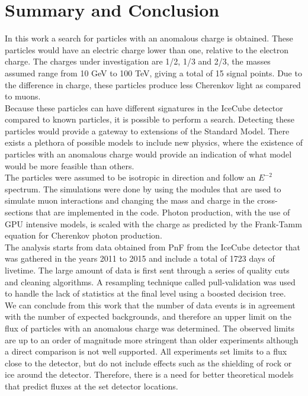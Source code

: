 \chapter{Summary and Conclusion}
\label{ch:summary}
In this work a search for particles with an anomalous charge is obtained. These particles would have an electric charge lower than one, relative to the electron charge. The charges under investigation are 1/2, 1/3 and 2/3, the masses assumed range from 10 GeV to 100 TeV, giving a total of 15 signal points. Due to the difference in charge, these particles produce less Cherenkov light as compared to muons.\\

\noindent Because these particles can have different signatures in the IceCube detector compared to known particles, it is possible to perform a search. Detecting these particles would provide a gateway to extensions of the Standard Model. There exists a plethora of possible models to include new physics, where the existence of particles with an anomalous charge would provide an indication of what model would be more feasible than others.\\

\noindent The particles were assumed to be isotropic in direction and follow an $E^{-2}$ spectrum. The simulations were done by using the modules that are used to simulate muon interactions and changing the mass and charge in the cross-sections that are implemented in the code. Photon production, with the use of GPU intensive models, is scaled with the charge as predicted by the Frank-Tamm equation for Cherenkov photon production.\\

\noindent The analysis starts from data obtained from PnF from the IceCube detector that was gathered in the years 2011 to 2015 and include a total of 1723 days of livetime. The large amount of data is first sent through a series of quality cuts and cleaning algorithms. A resampling technique called pull-validation was used to handle the lack of statistics at the final level using a boosted decision tree.\\

\noindent We can conclude from this work that the number of data events is in agreement with the number of expected backgrounds, and therefore an upper limit on the flux of particles with an anomalous charge was determined. The observed limits are up to an order of magnitude more stringent than older experiments although a direct comparison is not well supported. All experiments set limits to a flux close to the detector, but do not include effects such as the shielding of rock or ice around the detector. Therefore, there is a need for better theoretical models that predict fluxes at the set detector locations.\\

